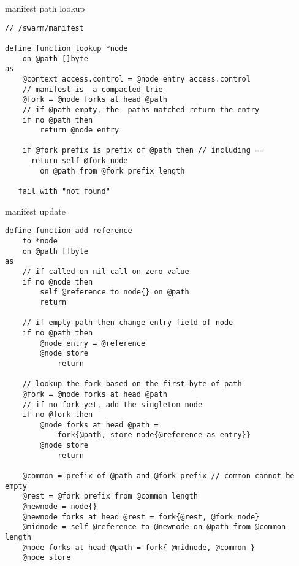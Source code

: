 \begin{definition}{manifest path lookup}\label{def:manifests-lookup}
\begin{lstlisting}[language=buzz1]
// /swarm/manifest

define function lookup *node
    on @path []byte
as 
    @context access.control = @node entry access.control 
    // manifest is  a compacted trie
    @fork = @node forks at head @path 
    // if @path empty, the  paths matched return the entry
    if no @path then 
        return @node entry

    if @fork prefix is prefix of @path then // including == 
      return self @fork node 
        on @path from @fork prefix length

   fail with "not found"

\end{lstlisting}
\end{definition}


\begin{definition}{manifest update}\label{def:manifest-update}
\begin{lstlisting}[language=buzz1]
define function add reference  
    to *node 
    on @path []byte 
as
    // if called on nil call on zero value
    if no @node then 
        self @reference to node{} on @path
        return

    // if empty path then change entry field of node
    if no @path then
        @node entry = @reference
        @node store 
            return

    // lookup the fork based on the first byte of path
    @fork = @node forks at head @path
    // if no fork yet, add the singleton node 
    if no @fork then
        @node forks at head @path =
            fork{@path, store node{@reference as entry}}
        @node store 
            return

    @common = prefix of @path and @fork prefix // common cannot be empty
    @rest = @fork prefix from @common length
    @newnode = node{}
    @newnode forks at head @rest = fork{@rest, @fork node}
    @midnode = self @reference to @newnode on @path from @common length 
    @node forks at head @path = fork{ @midnode, @common } 
    @node store
\end{lstlisting}
\end{definition}